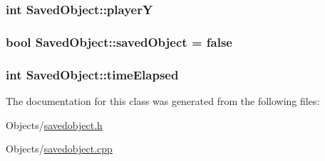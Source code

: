 \subsubsection[{\texorpdfstring{playerY}{playerY}}]{\setlength{\rightskip}{0pt plus 5cm}int Saved\+Object\+::playerY\hspace{0.3cm}{\ttfamily [protected]}}\hypertarget{classSavedObject_a345931b3a8ac7b64a9882a64c61e25fd}{}\label{classSavedObject_a345931b3a8ac7b64a9882a64c61e25fd}
\subsubsection[{\texorpdfstring{saved\+Object}{savedObject}}]{\setlength{\rightskip}{0pt plus 5cm}bool Saved\+Object\+::saved\+Object = false\hspace{0.3cm}{\ttfamily [protected]}}\hypertarget{classSavedObject_a14a0077fd01cebba928203f9e35be0f5}{}\label{classSavedObject_a14a0077fd01cebba928203f9e35be0f5}
\subsubsection[{\texorpdfstring{time\+Elapsed}{timeElapsed}}]{\setlength{\rightskip}{0pt plus 5cm}int Saved\+Object\+::time\+Elapsed\hspace{0.3cm}{\ttfamily [protected]}}\hypertarget{classSavedObject_a159f6863f00683638635cd784299d1b9}{}\label{classSavedObject_a159f6863f00683638635cd784299d1b9}


The documentation for this class was generated from the following files\+:\begin{DoxyCompactItemize}
\item 
Objects/\hyperlink{savedobject_8h}{savedobject.\+h}\item 
Objects/\hyperlink{savedobject_8cpp}{savedobject.\+cpp}\end{DoxyCompactItemize}
